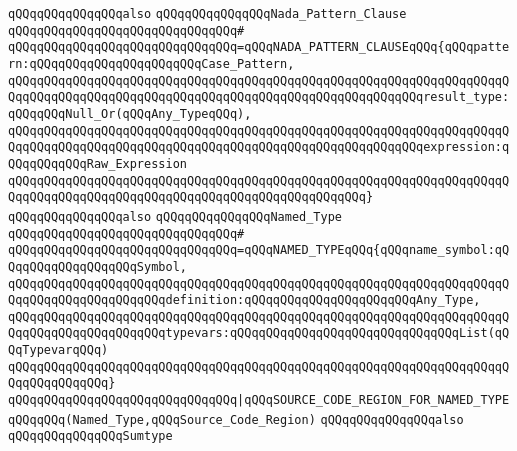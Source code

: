 \verb|qQQqqQQqqQQqqQQqalso|\newline
\verb|qQQqqQQqqQQqqQQqNada_Pattern_Clause|\newline
\verb|qQQqqQQqqQQqqQQqqQQqqQQqqQQqqQQq#|\newline
\verb|qQQqqQQqqQQqqQQqqQQqqQQqqQQqqQQq=qQQqNADA_PATTERN_CLAUSEqQQq{qQQqpattern:qQQqqQQqqQQqqQQqqQQqqQQqCase_Pattern,|\newline
\verb|qQQqqQQqqQQqqQQqqQQqqQQqqQQqqQQqqQQqqQQqqQQqqQQqqQQqqQQqqQQqqQQqqQQqqQQqqQQqqQQqqQQqqQQqqQQqqQQqqQQqqQQqqQQqqQQqqQQqqQQqqQQqqQQqresult_type:qQQqqQQqNull_Or(qQQqAny_TypeqQQq),|\newline
\verb|qQQqqQQqqQQqqQQqqQQqqQQqqQQqqQQqqQQqqQQqqQQqqQQqqQQqqQQqqQQqqQQqqQQqqQQqqQQqqQQqqQQqqQQqqQQqqQQqqQQqqQQqqQQqqQQqqQQqqQQqqQQqqQQqexpression:qQQqqQQqqQQqRaw_Expression|\newline
\verb|qQQqqQQqqQQqqQQqqQQqqQQqqQQqqQQqqQQqqQQqqQQqqQQqqQQqqQQqqQQqqQQqqQQqqQQqqQQqqQQqqQQqqQQqqQQqqQQqqQQqqQQqqQQqqQQqqQQqqQQq}|\newline
\newline
\newline
\verb|qQQqqQQqqQQqqQQqalso|\newline
\verb|qQQqqQQqqQQqqQQqNamed_Type|\newline
\verb|qQQqqQQqqQQqqQQqqQQqqQQqqQQqqQQq#|\newline
\verb|qQQqqQQqqQQqqQQqqQQqqQQqqQQqqQQq=qQQqNAMED_TYPEqQQq{qQQqname_symbol:qQQqqQQqqQQqqQQqqQQqSymbol,|\newline
\verb|qQQqqQQqqQQqqQQqqQQqqQQqqQQqqQQqqQQqqQQqqQQqqQQqqQQqqQQqqQQqqQQqqQQqqQQqqQQqqQQqqQQqqQQqqQQqdefinition:qQQqqQQqqQQqqQQqqQQqqQQqAny_Type,|\newline
\verb|qQQqqQQqqQQqqQQqqQQqqQQqqQQqqQQqqQQqqQQqqQQqqQQqqQQqqQQqqQQqqQQqqQQqqQQqqQQqqQQqqQQqqQQqqQQqtypevars:qQQqqQQqqQQqqQQqqQQqqQQqqQQqqQQqList(qQQqTypevarqQQq)|\newline
\verb|qQQqqQQqqQQqqQQqqQQqqQQqqQQqqQQqqQQqqQQqqQQqqQQqqQQqqQQqqQQqqQQqqQQqqQQqqQQqqQQqqQQq}|\newline
\newline
\verb|qQQqqQQqqQQqqQQqqQQqqQQqqQQqqQQq|\verb#|qQQqSOURCE_CODE_REGION_FOR_NAMED_TYPEqQQqqQQq(Named_Type,qQQqSource_Code_Region)#\newline
\newline
\newline
\newline
\verb|qQQqqQQqqQQqqQQqalso|\newline
\verb|qQQqqQQqqQQqqQQqSumtype|\newline
